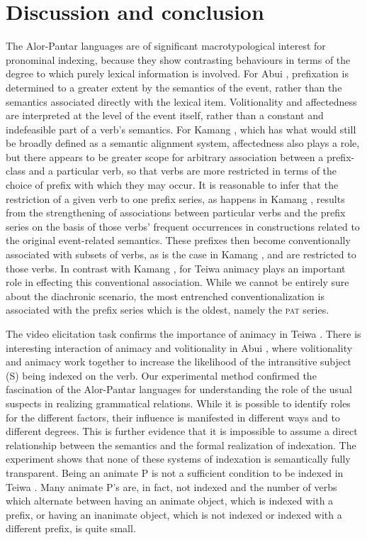 \section{Discussion and conclusion}
\label{sec:10:6}
The Alor-Pantar languages are of significant macrotypological interest for pronominal indexing, because they show contrasting behaviours in terms of the degree to which purely lexical information is involved. For Abui , prefixation is determined to a greater extent by the semantics of the event, rather than the semantics associated directly with the lexical item. Volitionality  and affectedness  are interpreted at the level of the event itself, rather than a constant and indefeasible part of a verb's semantics. For Kamang , which has what would still be broadly defined as a semantic alignment system, affectedness also plays a role, but there appears to be greater scope for arbitrary association between a prefix-class and a particular verb, so that verbs are more restricted in terms of the choice of prefix with which they may occur. It is reasonable to infer that the restriction of a given verb to one prefix series, as happens in Kamang , results from the strengthening of associations between particular verbs and the prefix series on the basis of those verbs' frequent occurrences in constructions related to the original event-related semantics. These prefixes then become conventionally  associated with subsets of verbs, as is the case in Kamang , and are restricted to those verbs. In contrast with Kamang , for Teiwa  animacy  plays an important role in effecting this conventional association. While we cannot be entirely sure about the diachronic scenario, the most entrenched conventionalization is associated with the prefix series which is the oldest, namely the \textsc{pat} series.

  The video elicitation task confirms the importance of animacy in Teiwa . There is interesting interaction of animacy and volitionality in Abui , where volitionality and animacy work together to increase the likelihood of the intransitive subject  (S) being indexed on the verb. Our experimental method confirmed the fascination of the Alor-Pantar languages for understanding the role of the usual suspects in realizing grammatical relations. While it is possible to identify roles for the different factors, their influence is manifested in different ways and to different degrees. This is further evidence that it is impossible to assume a direct relationship between the semantics and the formal realization of indexation. The experiment shows that none of these systems of indexation is semantically fully transparent. Being an animate P is not a sufficient condition to be indexed in Teiwa . Many animate P's are, in fact, not indexed and the number of verbs which alternate between having an animate object, which is indexed with a prefix, or having an inanimate object, which is not indexed or indexed with a different prefix, is quite small.

